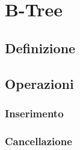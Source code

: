 
\chapter{B-Tree}

\section{Definizione}
\section{Operazioni}
\subsection{Inserimento}
\subsection{Cancellazione}